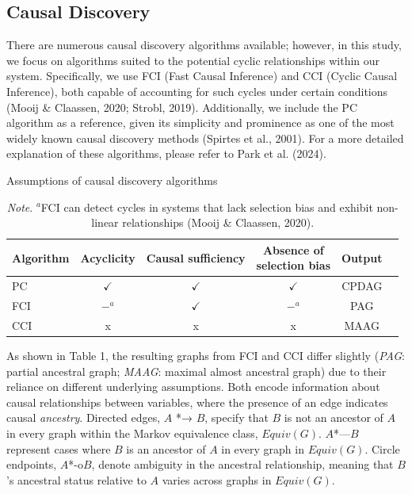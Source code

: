 \documentclass[
]{article}
\begin{document}
\subsection{Causal Discovery}\label{causal-discovery}

There are numerous causal discovery algorithms available; however, in
this study, we focus on algorithms suited to the potential cyclic
relationships within our system. Specifically, we use FCI (Fast Causal
Inference) and CCI (Cyclic Causal Inference), both capable of accounting
for such cycles under certain conditions (Mooij \& Claassen, 2020;
Strobl, 2019). Additionally, we include the PC algorithm as a reference,
given its simplicity and prominence as one of the most widely known
causal discovery methods (Spirtes et al., 2001). For a more detailed
explanation of these algorithms, please refer to Park et al. (2024).

\begin{table}[ht]
\centering
\caption{Assumptions of causal discovery algorithms}
\begin{tabular}{lccccl}
\toprule
Algorithm & Acyclicity & Causal sufficiency & 
\makecell{Absence of \\ selection bias} & Output \\ 
\midrule
PC  & $\checkmark$ & $\checkmark$ & $\checkmark$ & CPDAG \\ 
FCI & $-^{a}$ & $\checkmark$ & $-^{a}$ & PAG \\ 
CCI & x & x & x & MAAG \\ 
\bottomrule
\end{tabular}
\caption*{\small{\textit{Note}. $^{a}$FCI can detect cycles in systems that lack selection bias and exhibit non-linear relationships (Mooij \& Claassen, 2020).}}
\end{table}

As shown in Table 1, the resulting graphs from FCI and CCI differ
slightly (\emph{PAG}: partial ancestral graph; \emph{MAAG}: maximal
almost ancestral graph) due to their reliance on different underlying
assumptions. Both encode information about causal relationships between
variables, where the presence of an edge indicates causal
\emph{ancestry}. Directed edges, \(A\) *→ \(B\), specify that \(B\) is
not an ancestor of \(A\) in every graph within the Markov equivalence
class, \(Equiv(G)\). \(A\)*---\(B\) represent cases where \(B\) is an
ancestor of \(A\) in every graph in \(Equiv(G)\). Circle endpoints,
\(A\)*-o\(B\), denote ambiguity in the ancestral relationship, meaning
that \(B\)'s ancestral status relative to \(A\) varies across graphs in
\(Equiv(G)\).
\end{document}
